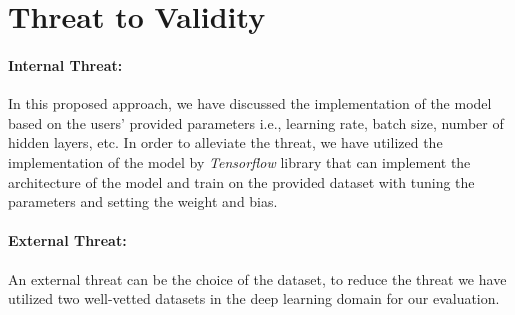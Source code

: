 \section{Threat to Validity}
\label{sec:threat}
\paragraph{\textbf{Internal Threat:}} In this proposed approach, we have discussed the implementation of the model based on the users' provided parameters i.e., learning rate, batch size, number of hidden layers, etc. In order to alleviate the threat, we have utilized the implementation of the model by \emph{Tensorflow} library that can implement the architecture of the model and train on the provided dataset with tuning the parameters and setting the weight and bias.
\paragraph{\textbf{External Threat:}} An external threat can be the choice of the dataset, to reduce the threat we have utilized two well-vetted datasets in the deep learning domain for our evaluation.